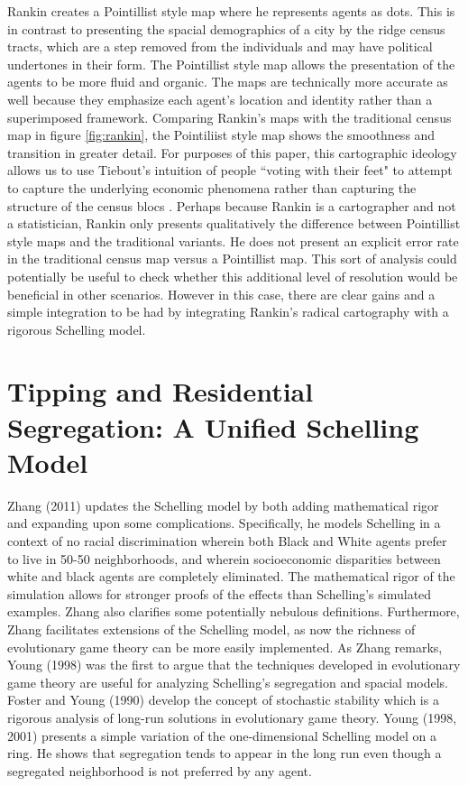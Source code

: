 {Rankin creates a Pointillist style map where he represents agents as dots. This is in contrast to presenting the spacial demographics of a city by the ridge census tracts, which are a step removed from the individuals and may have political undertones in their form. The Pointillist style map allows the presentation of the agents to be more fluid and organic. The maps are technically more accurate as well because they emphasize each agent's location and identity rather than a superimposed framework. Comparing Rankin's maps with the traditional census map in figure \ref{fig:rankin}, the Pointiliist style map shows the smoothness and transition in greater detail. For purposes of this paper, this cartographic ideology allows us to use Tiebout's intuition of people ``voting with their feet" to attempt to capture the underlying economic phenomena rather than capturing the structure of the census blocs \cite{tiebout56}. Perhaps because Rankin is a cartographer and not a statistician, Rankin only presents qualitatively the difference between Pointillist style maps and the traditional variants\cite{rankin10}. He does not present an explicit error rate in the traditional census map versus a Pointillist map. This sort of analysis could potentially be useful to check whether this additional level of resolution would be beneficial in other scenarios. However in this case, there are clear gains and a simple integration to be had by integrating Rankin's radical cartography with a rigorous Schelling model.

\section{Tipping and Residential Segregation: A Unified Schelling Model}

Zhang (2011) \cite{zhang11} updates the Schelling model by both adding mathematical rigor and expanding upon some complications. Specifically, he models Schelling in a context of no racial discrimination wherein both Black and White agents prefer to live in 50-50 neighborhoods, and wherein socioeconomic disparities between white and black agents are completely eliminated. The mathematical rigor of the simulation allows for stronger proofs of the effects than Schelling's simulated examples. Zhang also clarifies some potentially nebulous definitions. Furthermore, Zhang facilitates extensions of the Schelling model, as now the richness of evolutionary game theory can be more easily implemented. As Zhang remarks, Young (1998) was the first to argue that the techniques developed in evolutionary game theory are useful for analyzing Schelling’s segregation and spacial models\cite{young98}. Foster and Young (1990) develop the concept of stochastic stability which is a rigorous analysis of long-run solutions in evolutionary game theory\cite{foster90}. Young (1998, 2001) presents a simple variation of the one-dimensional Schelling model on a ring\cite{young98,young01}. He shows that segregation tends to appear in the long run even though a segregated neighborhood is not preferred by any agent.

}
